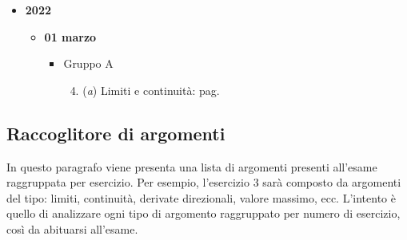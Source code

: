 \documentclass[a4paper]{article}
\begin{document}
\begin{itemize}
		\item \textbf{2022}
		\begin{itemize}
			\item \textbf{01 marzo}
			\begin{itemize}
				\item Gruppo A
				\begin{enumerate}[label*=Ex. \arabic*), leftmargin = 4em]
					\setcounter{enumi}{3}
					\item (\emph{a}) Limiti e continuità: pag.~\hyperlink{
						exam: esame 01 marzo 2022 - Gruppo A - 4 esercizio (a)
					}{
					}
				\end{enumerate}
			\end{itemize}
		\end{itemize}
	\end{itemize}

	\newpage

	\subsection{Raccoglitore di argomenti}

	In questo paragrafo viene presenta una lista di argomenti presenti all'esame raggruppata per esercizio. Per esempio, l'esercizio 3 sarà composto da argomenti del tipo: limiti, continuità, derivate direzionali, valore massimo, ecc. L'intento è quello di analizzare ogni tipo di argomento raggruppato per numero di esercizio, così da abituarsi all'esame.
\end{document}
